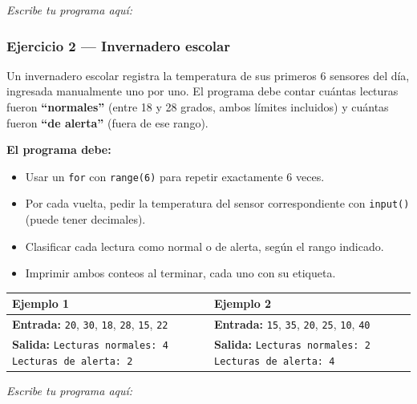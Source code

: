 \documentclass[11pt]{article}
\begin{document}
\vspace{1mm}\textit{Escribe tu programa aquí:}
\begin{cajaescribe}[height=8.5cm]
\end{cajaescribe}

\newpage
\subsubsection*{Ejercicio 2 --- Invernadero escolar}
Un invernadero escolar registra la temperatura de sus primeros 6 sensores del día, ingresada manualmente uno por uno. El programa debe contar cuántas lecturas fueron \textbf{``normales''} (entre 18 y 28 grados, ambos límites incluidos) y cuántas fueron \textbf{``de alerta''} (fuera de ese rango).

\textbf{El programa debe:}
\begin{itemize}
  \item Usar un \texttt{for} con \texttt{range(6)} para repetir exactamente 6 veces.
  \item Por cada vuelta, pedir la temperatura del sensor correspondiente con \texttt{input()} (puede tener decimales).
  \item Clasificar cada lectura como normal o de alerta, según el rango indicado.
  \item Imprimir ambos conteos al terminar, cada uno con su etiqueta.
\end{itemize}



\vspace{1mm}
{\footnotesize
\renewcommand{\arraystretch}{0.85}
\setlength{\tabcolsep}{4pt}
\noindent\begin{tabularx}{\linewidth}{|Y|Y|}
\hline
\textbf{Ejemplo 1} & \textbf{Ejemplo 2} \\
\hline
\textbf{Entrada:} \texttt{20}, \texttt{30}, \texttt{18}, \texttt{28}, \texttt{15}, \texttt{22} & \textbf{Entrada:} \texttt{15}, \texttt{35}, \texttt{20}, \texttt{25}, \texttt{10}, \texttt{40} \\
\hline
\textbf{Salida:} \texttt{Lecturas normales: 4} \newline \texttt{Lecturas de alerta: 2} & \textbf{Salida:} \texttt{Lecturas normales: 2} \newline \texttt{Lecturas de alerta: 4} \\
\hline
\end{tabularx}
}

\vspace{1mm}\textit{Escribe tu programa aquí:}
\begin{cajaescribe}[height=8.5cm]
\end{cajaescribe}
\end{document}
